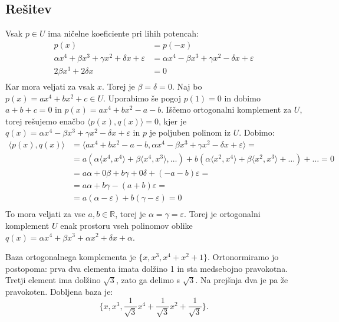 \documentclass[a4,11pt]{article}
\newcommand{\R}{\mathbb{R}}
\begin{document}
\subsection*{Rešitev}
    Vsak \(p \in U\) ima ničelne koeficiente pri lihih potencah:
    \begin{align*}
        p(x) &= p(-x) \\
        \alpha x^4 + \beta x^3 + \gamma x^2 + \delta x + \varepsilon &= \alpha x^4 - \beta x^3 + \gamma x^2 - \delta x + \varepsilon \\
        2\beta x^3 + 2\delta x &= 0 \\
    \end{align*}
    Kar mora veljati za vsak \(x\). Torej je \(\beta = \delta = 0\). Naj bo \(p(x) = a x^4 + b x^2 + c \in U\). Uporabimo
    še pogoj \(p(1) = 0\) in dobimo \(a + b + c = 0\) in \(p(x) = a x^4 + b x^2 - a - b\).
    Iščemo ortogonalni komplement za \(U\), torej rešujemo enačbo \(\langle p(x), q(x)\rangle = 0\), kjer je \(q(x) = \alpha x^4 - \beta x^3 + \gamma x^2 - \delta x + \varepsilon\)
    in \(p\) je poljuben polinom iz \(U\). Dobimo:
    \begin{align*}
        \langle p(x), q(x)\rangle &= \langle a x^4 + b x^2 - a - b, \alpha x^4 - \beta x^3 + \gamma x^2 - \delta x + \varepsilon\rangle = \\
        &= a\left(\alpha\langle x^4, x^4\rangle + \beta\langle x^4, x^3\rangle, \dots\right) + b\left(\alpha\langle x^2, x^4\rangle + \beta\langle x^2, x^3\rangle + \dots\right) + \dots = 0 \\
        &= a\alpha + 0\beta + b\gamma + 0\delta + \left(-a-b\right)\varepsilon = \\
        &= a\alpha + b\gamma - \left(a+b\right)\varepsilon = \\
        &= a(\alpha - \varepsilon) + b(\gamma - \varepsilon) = 0 \\
    \end{align*}
    To mora veljati za vse \(a, b \in \R\), torej je \(\alpha = \gamma = \varepsilon\).
    Torej je ortogonalni komplement \(U\) enak prostoru vseh polinomov oblike \(q(x) = \alpha x^4 + \beta x^3 + \alpha x^2 + \delta x + \alpha\).

    Baza ortogonalnega komplementa je \(\{x, x^3, x^4 + x^2 + 1\}\). Ortonormiramo jo postopoma: prva dva elementa imata dolžino 1 in 
    sta medsebojno pravokotna. Tretji element ima dolžino \(\sqrt{3}\), zato ga delimo s \(\sqrt{3}\). Na prejšnja dva je pa že pravokoten.
    Dobljena baza je:
    \[\{x, x^3, \frac{1}{\sqrt{3}}x^4 + \frac{1}{\sqrt{3}}x^2 + \frac{1}{\sqrt{3}}\}.\]
\end{document}

